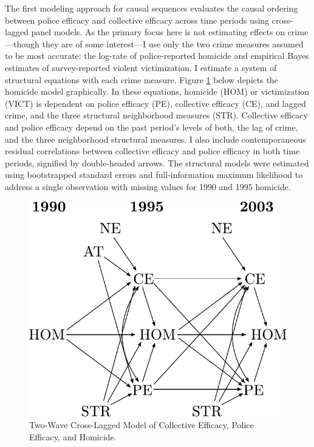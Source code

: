 \documentclass [11pt, proquest] {uwthesis}[2015/03/03]
\begin{document}
The first modeling approach for causal sequences evaluates the causal ordering between police efficacy and collective efficacy across time periods using cross-lagged panel models. As the primary focus here is not estimating effects on crime---though they are of some interest---I use only the two crime measures assumed to be most accurate: the log-rate of police-reported homicide and empirical Bayes estimates of survey-reported violent victimization. I estimate a system of structural equations with each crime measure. Figure \ref{fig:crosslagmodel} below depicts the homicide model graphically. In these equations, homicide (HOM) or victimization (VICT) is dependent on police efficacy (PE), collective efficacy (CE), and lagged crime, and the three structural neighborhood measures (STR). Collective efficacy and police efficacy depend on the past period's levels of both, the lag of crime, and the three neighborhood structural measures. I also include contemporaneous residual correlations between collective efficacy and police efficacy in both time periods, signified by double-headed arrows. The structural models were estimated using bootstrapped standard errors and full-information maximum likelihood to address a single observation with missing values for 1990 and 1995 homicide.
\begin{figure}

{\centering \includegraphics[width=0.6\linewidth]{./figure/ch3/crosslag_model} 

}

\caption{Two-Wave Cross-Lagged Model of Collective Efficacy, Police Efficacy, and Homicide.}\label{fig:crosslagmodel}
\end{figure}
\end{document}
